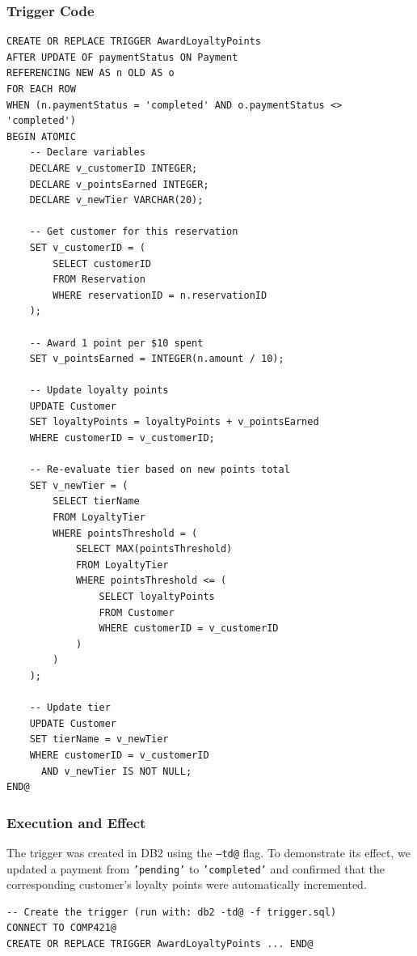 \documentclass[12pt,letterpaper]{article}
\begin{document}
\subsubsection*{Trigger Code}

\begin{lstlisting}[style=sqlstyle, caption={Trigger: Award loyalty points on payment completion}]
CREATE OR REPLACE TRIGGER AwardLoyaltyPoints
AFTER UPDATE OF paymentStatus ON Payment
REFERENCING NEW AS n OLD AS o
FOR EACH ROW
WHEN (n.paymentStatus = 'completed' AND o.paymentStatus <> 'completed')
BEGIN ATOMIC
    -- Declare variables
    DECLARE v_customerID INTEGER;
    DECLARE v_pointsEarned INTEGER;
    DECLARE v_newTier VARCHAR(20);

    -- Get customer for this reservation
    SET v_customerID = (
        SELECT customerID
        FROM Reservation
        WHERE reservationID = n.reservationID
    );

    -- Award 1 point per $10 spent
    SET v_pointsEarned = INTEGER(n.amount / 10);

    -- Update loyalty points
    UPDATE Customer
    SET loyaltyPoints = loyaltyPoints + v_pointsEarned
    WHERE customerID = v_customerID;

    -- Re-evaluate tier based on new points total
    SET v_newTier = (
        SELECT tierName
        FROM LoyaltyTier
        WHERE pointsThreshold = (
            SELECT MAX(pointsThreshold)
            FROM LoyaltyTier
            WHERE pointsThreshold <= (
                SELECT loyaltyPoints
                FROM Customer
                WHERE customerID = v_customerID
            )
        )
    );

    -- Update tier
    UPDATE Customer
    SET tierName = v_newTier
    WHERE customerID = v_customerID
      AND v_newTier IS NOT NULL;
END@
\end{lstlisting}

\subsubsection*{Execution and Effect}

The trigger was created in DB2 using the \texttt{--td@} flag. To demonstrate its effect, we updated a payment from \texttt{'pending'} to \texttt{'completed'} and confirmed that the corresponding customer's loyalty points were automatically incremented.

\begin{lstlisting}[style=sqlstyle, caption={Creating the trigger}]
-- Create the trigger (run with: db2 -td@ -f trigger.sql)
CONNECT TO COMP421@
CREATE OR REPLACE TRIGGER AwardLoyaltyPoints ... END@
\end{lstlisting}
\end{document}
